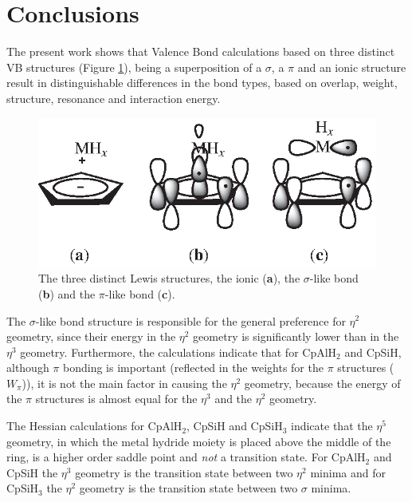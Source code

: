 \section{Conclusions}

The present work shows that Valence Bond calculations based on three distinct VB structures (Figure \ref{ch4.fig.lewis}), being a superposition of a $\sigma$, a $\pi$ and an ionic structure result in distinguishable differences in the bond types, based on overlap, weight, structure, resonance and interaction energy.
\begin{figure}[htdp]
\begin{center}
\includegraphics{cyclopentadienyl/figures/lewis.eps}
\end{center}
\caption{The three distinct Lewis structures, the ionic (\textbf{a}), the $\sigma$-like bond (\textbf{b}) and
the $\pi$-like bond (\textbf{c}).}
\label{ch4.fig.lewis}
\end{figure}
The $\sigma$-like bond structure is responsible for the general preference for $\eta^{2}$ geometry, since their energy in the $\eta^2$ geometry is significantly lower than in the $\eta^3$ geometry. Furthermore, the calculations indicate that for CpAlH$_2$ and CpSiH, although $\pi$ bonding is important (reflected in the weights for the $\pi$ structures ($W_\pi$)), it is not the main factor in causing the $\eta^{2}$ geometry, because the energy of the $\pi$ structures is almost equal for the $\eta^3$ and the $\eta^2$ geometry. 

The Hessian calculations for CpAlH$_2$, CpSiH and CpSiH$_3$ indicate that the $\eta^5$ geometry, in which the metal hydride moiety is placed above the middle of the ring, is a higher order saddle point and \textit{not} a transition state. For CpAlH$_2$ and CpSiH the $\eta^3$ geometry is the transition state between two $\eta^2$ minima and for CpSiH$_3$ the $\eta^2$ geometry is the transition state between two $\sigma$ minima.

